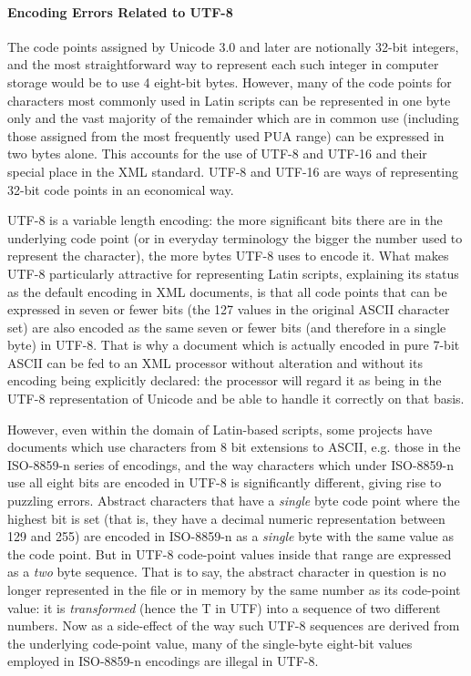 \paragraph[{Encoding Errors Related to UTF-8}]{Encoding Errors Related to UTF-8}\label{D4-48-1}\par
The code points assigned by Unicode 3.0 and later are notionally 32-bit integers, and the most straightforward way to represent each such integer in computer storage would be to use 4 eight-bit bytes. However, many of the code points for characters most commonly used in Latin scripts can be represented in one byte only and the vast majority of the remainder which are in common use (including those assigned from the most frequently used PUA range) can be expressed in two bytes alone. This accounts for the use of UTF-8 and UTF-16 and their special place in the XML standard. UTF-8 and UTF-16 are ways of representing 32-bit code points in an economical way. \par
UTF-8 is a variable length encoding: the more significant bits there are in the underlying code point (or in everyday terminology the bigger the number used to represent the character), the more bytes UTF-8 uses to encode it. What makes UTF-8 particularly attractive for representing Latin scripts, explaining its status as the default encoding in XML documents, is that all code points that can be expressed in seven or fewer bits (the 127 values in the original ASCII character set) are also encoded as the same seven or fewer bits (and therefore in a single byte) in UTF-8. That is why a document which is actually encoded in pure 7-bit ASCII can be fed to an XML processor without alteration and without its encoding being explicitly declared: the processor will regard it as being in the UTF-8 representation of Unicode and be able to handle it correctly on that basis.\par
However, even within the domain of Latin-based scripts, some projects have documents which use characters from 8 bit extensions to ASCII, e.g. those in the ISO-8859-n series of encodings, and the way characters which under ISO-8859-n use all eight bits are encoded in UTF-8 is significantly different, giving rise to puzzling errors. Abstract characters that have a \textit{single} byte code point where the highest bit is set (that is, they have a decimal numeric representation between 129 and 255) are encoded in ISO-8859-n as a \textit{single} byte with the same value as the code point. But in UTF-8 code-point values inside that range are expressed as a \textit{two} byte sequence. That is to say, the abstract character in question is no longer represented in the file or in memory by the same number as its code-point value: it is {\itshape transformed} (hence the T in UTF) into a sequence of two different numbers. Now as a side-effect of the way such UTF-8 sequences are derived from the underlying code-point value, many of the single-byte eight-bit values employed in ISO-8859-n encodings are illegal in UTF-8.\par
